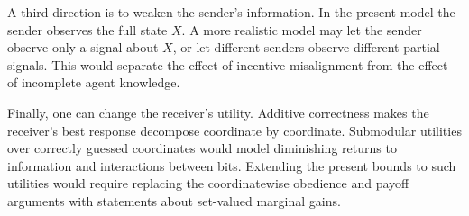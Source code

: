 \documentclass[format=acmsmall, review=false]{acmart}
\begin{document}
A third direction is to weaken the sender's information. In the present model
the sender observes the full state $X$. A more realistic model may let the
sender observe only a signal about $X$, or let different senders observe
different partial signals. This would separate the effect of incentive
misalignment from the effect of incomplete agent knowledge.

Finally, one can change the receiver's utility. Additive correctness makes the
receiver's best response decompose coordinate by coordinate. Submodular
utilities over correctly guessed coordinates would model diminishing returns to
information and interactions between bits. Extending the present bounds to such
utilities would require replacing the coordinatewise obedience and payoff
arguments with statements about set-valued marginal gains.



\end{document}
